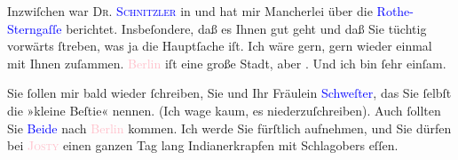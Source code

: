 \pstart
           Inzwiſchen war \textsc{Dr. \textcolor{blue}{Schnitzler}{}\ledrightnote{}} in \strikeout{\textcolor{pink}{Wien}{}\ledrightnote{\textcolor{pink}{Wien}}}{ }\label{K_L03537-1v}\label{K_L03537-1h} und hat mir
               Mancherlei über die \textcolor{pink}{\textcolor{blue}{Rothe-Sterngaſſe}{}\ledrightnote{{$\rightarrow$}\textcolor{blue}{Elisabeth Steinrück}}}{}\ledrightnote{\textcolor{pink}{Rotensterngasse}} berichtet. Insbeſondere, daß es Ihnen gut geht und daß Sie tüchtig vorwärts
               ſtreben, was ja die Hauptſache iſt. Ich wäre gern, gern wieder einmal mit Ihnen
               zuſammen. \textcolor{pink}{Berlin}{}\ledrightnote{\textcolor{pink}{Berlin}} iſt eine große Stadt, aber
                  \label{K_L03537-2v}\label{K_L03537-2h}. Und ich bin ſehr einſam.\pend
           
\pstart
           Sie ſollen mir bald wieder ſchreiben, Sie und Ihr Fräulein \textcolor{blue}{Schweſter}{}\ledrightnote{{$\rightarrow$}\textcolor{blue}{Elisabeth Steinrück}}, das Sie ſelbſt die »kleine
               Beſtie« nennen. (Ich wage kaum, es niederzuſchreiben). Auch ſollten Sie \textcolor{blue}{Beide}{}\ledrightnote{{$\rightarrow$}\textcolor{blue}{Elisabeth Steinrück}} nach \textcolor{pink}{Berlin}{}\ledrightnote{\textcolor{pink}{Berlin}} kommen. Ich werde Sie fürſtlich aufnehmen, {\pb}und Sie dürfen bei \textsc{\textcolor{pink}{Josty}{}\ledrightnote{\textcolor{pink}{Café Josty}}} einen ganzen Tag lang Indianerkrapfen mit Schlagobers eſſen.\pend
           
